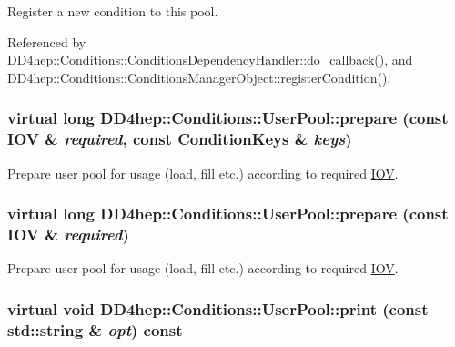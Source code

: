 Register a new condition to this pool. 

Referenced by DD4hep::Conditions::ConditionsDependencyHandler::do\_\-callback(), and DD4hep::Conditions::ConditionsManagerObject::registerCondition().\hypertarget{class_d_d4hep_1_1_conditions_1_1_user_pool_a91ce4579b205b59ef3012b8b97013abf}{
\subsubsection[{prepare}]{\setlength{\rightskip}{0pt plus 5cm}virtual long DD4hep::Conditions::UserPool::prepare (const {\bf IOV} \& {\em required}, \/  const {\bf ConditionKeys} \& {\em keys})}}
\label{class_d_d4hep_1_1_conditions_1_1_user_pool_a91ce4579b205b59ef3012b8b97013abf}


Prepare user pool for usage (load, fill etc.) according to required \hyperlink{class_d_d4hep_1_1_i_o_v}{IOV}. \hypertarget{class_d_d4hep_1_1_conditions_1_1_user_pool_aebbb5c871d30372eb33955aef9bfcaf0}{
\subsubsection[{prepare}]{\setlength{\rightskip}{0pt plus 5cm}virtual long DD4hep::Conditions::UserPool::prepare (const {\bf IOV} \& {\em required})}}
\label{class_d_d4hep_1_1_conditions_1_1_user_pool_aebbb5c871d30372eb33955aef9bfcaf0}


Prepare user pool for usage (load, fill etc.) according to required \hyperlink{class_d_d4hep_1_1_i_o_v}{IOV}. \hypertarget{class_d_d4hep_1_1_conditions_1_1_user_pool_ab0496fbbd4a84368595d3bbd80c475e3}{
\subsubsection[{print}]{\setlength{\rightskip}{0pt plus 5cm}virtual void DD4hep::Conditions::UserPool::print (const std::string \& {\em opt}) const}}
\label{class_d_d4hep_1_1_conditions_1_1_user_pool_ab0496fbbd4a84368595d3bbd80c475e3}


